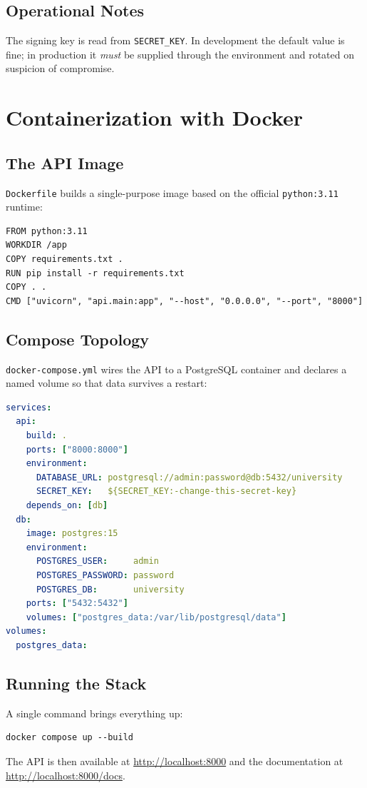 \documentclass[11pt]{book}
\begin{document}
\section{Operational Notes}
The signing key is read from \texttt{SECRET\_KEY}. In development the
default value is fine; in production it \emph{must} be supplied through
the environment and rotated on suspicion of compromise.

\chapter{Containerization with Docker}
\label{ch:docker}

\section{The API Image}
\texttt{Dockerfile} builds a single-purpose image based on the official
\texttt{python:3.11} runtime:
\begin{lstlisting}[style=base]
FROM python:3.11
WORKDIR /app
COPY requirements.txt .
RUN pip install -r requirements.txt
COPY . .
CMD ["uvicorn", "api.main:app", "--host", "0.0.0.0", "--port", "8000"]
\end{lstlisting}

\section{Compose Topology}
\texttt{docker-compose.yml} wires the API to a PostgreSQL container and
declares a named volume so that data survives a restart:
\begin{lstlisting}[style=base, language=yaml]
services:
  api:
    build: .
    ports: ["8000:8000"]
    environment:
      DATABASE_URL: postgresql://admin:password@db:5432/university
      SECRET_KEY:   ${SECRET_KEY:-change-this-secret-key}
    depends_on: [db]
  db:
    image: postgres:15
    environment:
      POSTGRES_USER:     admin
      POSTGRES_PASSWORD: password
      POSTGRES_DB:       university
    ports: ["5432:5432"]
    volumes: ["postgres_data:/var/lib/postgresql/data"]
volumes:
  postgres_data:
\end{lstlisting}

\section{Running the Stack}
A single command brings everything up:
\begin{lstlisting}[style=base]
docker compose up --build
\end{lstlisting}
The API is then available at \url{http://localhost:8000} and the
documentation at \url{http://localhost:8000/docs}.
\end{document}
